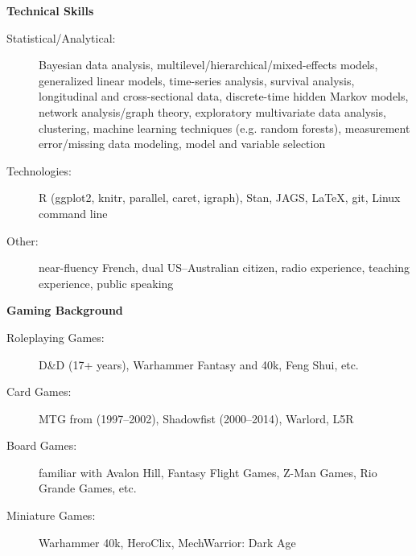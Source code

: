 \documentclass[letterpaper,11pt]{article}
\newcommand{\resheading}[1]{{\large \colorbox{mygrey}{\begin{minipage}{\textwidth}{\textbf{#1 \vphantom{p\^{E}}}}\end{minipage}}}}
\begin{document}

%

\vspace{0.22in}
\resheading{Technical Skills}
	\begin{description}
    \item[Statistical/Analytical:] { \footnotesize Bayesian data analysis, multilevel/hierarchical/mixed-effects models, generalized linear models, time-series analysis, survival analysis, longitudinal and cross-sectional data, discrete-time hidden Markov models, network analysis/graph theory, exploratory multivariate data analysis, clustering, machine learning techniques (e.g. random forests), measurement error/missing data modeling, model and variable selection }
    \item[Technologies:] { \footnotesize R (ggplot2, knitr, parallel, caret, igraph), Stan, JAGS, \LaTeX, git, Linux command line }
    \item[Other:] { \footnotesize near-fluency French, dual US--Australian citizen, radio experience, teaching experience, public speaking }
	\end{description} %


\resheading{Gaming Background}
  \begin{description}
    \item[Roleplaying Games:] { \footnotesize D\&D (17+ years), Warhammer Fantasy and 40k, Feng Shui, etc. }
    \item[Card Games:] { \footnotesize MTG from (1997--2002), Shadowfist (2000--2014), Warlord, L5R }
    \item[Board Games:] { \footnotesize familiar with Avalon Hill, Fantasy Flight Games, Z-Man Games, Rio Grande Games, etc. }
    \item[Miniature Games:] { \footnotesize Warhammer 40k, HeroClix, MechWarrior: Dark Age }
  \end{description}


\end{document}
